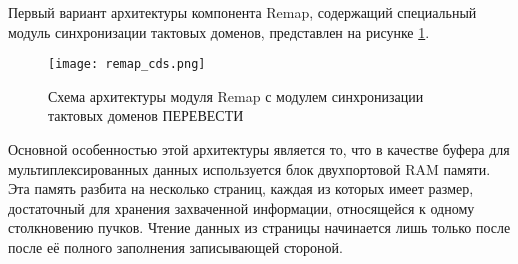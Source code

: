 Первый вариант архитектуры компонента Remap, содержащий специальный модуль синхронизации тактовых доменов, представлен на рисунке \ref{fig:remap_cds}.\par
\begin{figure}[ht]
    \centering
    \texttt{[image: remap\_cds.png]}
    \caption{Схема архитектуры модуля Remap с модулем синхронизации тактовых доменов ПЕРЕВЕСТИ}
    \label{fig:remap_cds}
\end{figure}\par
Основной особенностью этой архитектуры является то, что в качестве буфера для мультиплексированных данных используется блок двухпортовой RAM памяти. Эта память разбита на несколько страниц, каждая из которых имеет размер, достаточный для хранения захваченной информации, относящейся к одному столкновению пучков. Чтение данных из страницы начинается лишь только после после её полного заполнения записывающей стороной.\par
